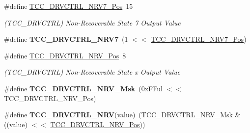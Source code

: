 \begin{DoxyCompactItemize}
\item 
\hypertarget{group___s_a_m_l21___t_c_c_ga366186e48f92234490554d72bae99789}{}\#define \hyperlink{group___s_a_m_l21___t_c_c_ga366186e48f92234490554d72bae99789}{T\+C\+C\+\_\+\+D\+R\+V\+C\+T\+R\+L\+\_\+\+N\+R\+V7\+\_\+\+Pos}~15\label{group___s_a_m_l21___t_c_c_ga366186e48f92234490554d72bae99789}

\begin{DoxyCompactList}\small\item\em (T\+C\+C\+\_\+\+D\+R\+V\+C\+T\+R\+L) Non-\/\+Recoverable State 7 Output Value \end{DoxyCompactList}\item 
\hypertarget{group___s_a_m_l21___t_c_c_ga85e9d2c1eec25289b5edcfe85a91957a}{}\#define {\bfseries T\+C\+C\+\_\+\+D\+R\+V\+C\+T\+R\+L\+\_\+\+N\+R\+V7}~(1 $<$$<$ \hyperlink{group___s_a_m_l21___t_c_c_ga366186e48f92234490554d72bae99789}{T\+C\+C\+\_\+\+D\+R\+V\+C\+T\+R\+L\+\_\+\+N\+R\+V7\+\_\+\+Pos})\label{group___s_a_m_l21___t_c_c_ga85e9d2c1eec25289b5edcfe85a91957a}

\item 
\hypertarget{group___s_a_m_l21___t_c_c_ga4b2e801de7cc3ae17038d8d3c4984fc1}{}\#define \hyperlink{group___s_a_m_l21___t_c_c_ga4b2e801de7cc3ae17038d8d3c4984fc1}{T\+C\+C\+\_\+\+D\+R\+V\+C\+T\+R\+L\+\_\+\+N\+R\+V\+\_\+\+Pos}~8\label{group___s_a_m_l21___t_c_c_ga4b2e801de7cc3ae17038d8d3c4984fc1}

\begin{DoxyCompactList}\small\item\em (T\+C\+C\+\_\+\+D\+R\+V\+C\+T\+R\+L) Non-\/\+Recoverable State x Output Value \end{DoxyCompactList}\item 
\hypertarget{group___s_a_m_l21___t_c_c_ga1b9add266a3f07118662129a9fad4941}{}\#define {\bfseries T\+C\+C\+\_\+\+D\+R\+V\+C\+T\+R\+L\+\_\+\+N\+R\+V\+\_\+\+Msk}~(0x\+F\+Ful $<$$<$ T\+C\+C\+\_\+\+D\+R\+V\+C\+T\+R\+L\+\_\+\+N\+R\+V\+\_\+\+Pos)\label{group___s_a_m_l21___t_c_c_ga1b9add266a3f07118662129a9fad4941}

\item 
\hypertarget{group___s_a_m_l21___t_c_c_ga26a7593940cce406ccad3740f1f3a39a}{}\#define {\bfseries T\+C\+C\+\_\+\+D\+R\+V\+C\+T\+R\+L\+\_\+\+N\+R\+V}(value)~(T\+C\+C\+\_\+\+D\+R\+V\+C\+T\+R\+L\+\_\+\+N\+R\+V\+\_\+\+Msk \& ((value) $<$$<$ \hyperlink{group___s_a_m_l21___t_c_c_ga4b2e801de7cc3ae17038d8d3c4984fc1}{T\+C\+C\+\_\+\+D\+R\+V\+C\+T\+R\+L\+\_\+\+N\+R\+V\+\_\+\+Pos}))\label{group___s_a_m_l21___t_c_c_ga26a7593940cce406ccad3740f1f3a39a}


\end{DoxyCompactItemize}
